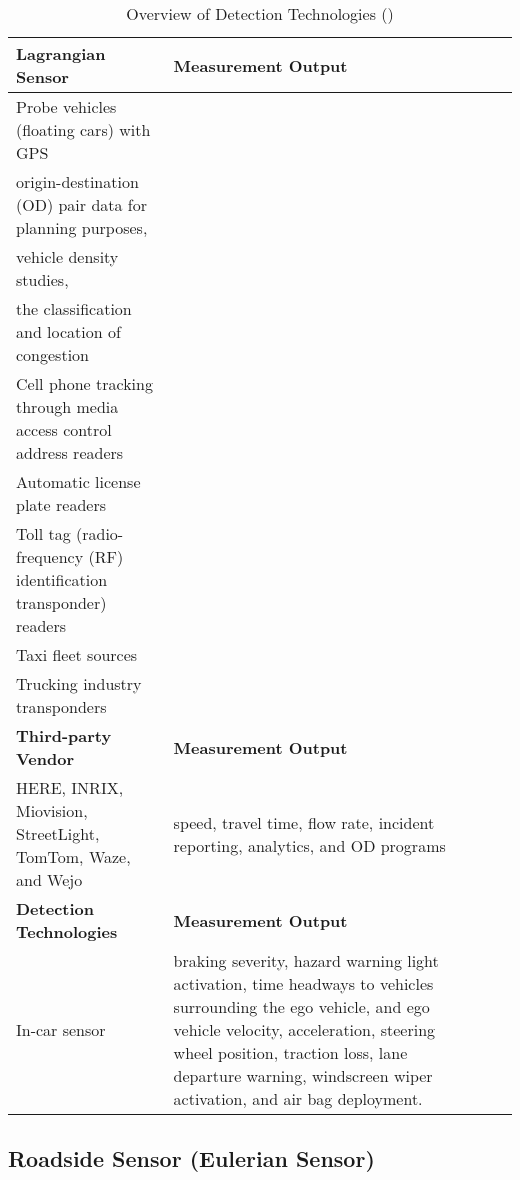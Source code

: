 \newpage
\begin{landscape}
\begin{table}
\centering
\footnotesize 
\caption{Overview of Detection Technologies \uppercase\expandafter{} (\textcite{klein2024roadside})}
\label{DT2}
\begin{tabularx}{\linewidth}{@{} l 
>{\hsize=1\hsize}X  %
>{\hsize=1\hsize}X  %
>{\hsize=1\hsize}X  %
@{}} 
\toprule
\textbf{Lagrangian Sensor} & \textbf{ Measurement Output}   \\
\midrule
Probe vehicles (floating cars) with GPS & \multirow{6}{*}{\begin{tabular}[c]{@{}l@{}}travel times, \\ origin-destination (OD) pair data for planning purposes, \\vehicle density studies, \\ the classification and location of congestion\end{tabular}}   \\
Cell phone tracking through media access control address readers&    \\
Automatic license plate readers&    \\
Toll tag (radio-frequency (RF) identification transponder) readers&    \\
Taxi fleet sources&    \\
Trucking industry transponders&    \\
\toprule
\textbf{Third-party Vendor} & \textbf{ Measurement Output}   \\
\midrule
HERE, INRIX, Miovision, StreetLight, TomTom, Waze, and Wejo  & speed, travel time, flow rate, incident reporting, analytics, and OD programs   \\
\toprule
\textbf{Detection Technologies} & \textbf{ Measurement Output}   \\
\midrule
In-car sensor & braking severity, hazard warning light activation, time headways to vehicles surrounding the ego vehicle, and ego vehicle velocity, acceleration, steering wheel position, traction loss, lane departure warning, windscreen wiper activation, and air bag deployment.   \\
\bottomrule
\end{tabularx}
\end{table}
\end{landscape}
\restoregeometry



\subsection{Roadside Sensor (Eulerian Sensor)}\label{Roadside Sensor (Eulerian Sensor)}

